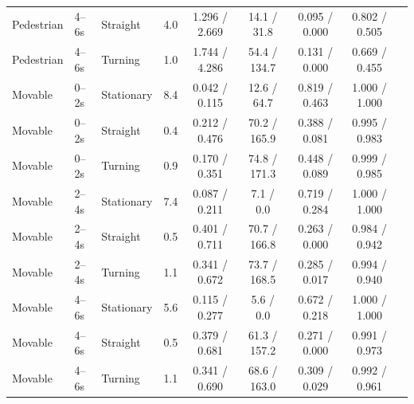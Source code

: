 \begin{tabular}{lllcccccc}
Pedestrian & 4--6s & Straight & 4.0 & 1.296 / 2.669 & 14.1 / 31.8 & 0.095 / 0.000 & 0.802 / 0.505 \\
Pedestrian & 4--6s & Turning & 1.0 & 1.744 / 4.286 & 54.4 / 134.7 & 0.131 / 0.000 & 0.669 / 0.455 \\
\midrule
Movable & 0--2s & Stationary & 8.4 & 0.042 / 0.115 & 12.6 / 64.7 & 0.819 / 0.463 & 1.000 / 1.000 \\
Movable & 0--2s & Straight & 0.4 & 0.212 / 0.476 & 70.2 / 165.9 & 0.388 / 0.081 & 0.995 / 0.983 \\
Movable & 0--2s & Turning & 0.9 & 0.170 / 0.351 & 74.8 / 171.3 & 0.448 / 0.089 & 0.999 / 0.985 \\
Movable & 2--4s & Stationary & 7.4 & 0.087 / 0.211 & 7.1 / 0.0 & 0.719 / 0.284 & 1.000 / 1.000 \\
Movable & 2--4s & Straight & 0.5 & 0.401 / 0.711 & 70.7 / 166.8 & 0.263 / 0.000 & 0.984 / 0.942 \\
Movable & 2--4s & Turning & 1.1 & 0.341 / 0.672 & 73.7 / 168.5 & 0.285 / 0.017 & 0.994 / 0.940 \\
Movable & 4--6s & Stationary & 5.6 & 0.115 / 0.277 & 5.6 / 0.0 & 0.672 / 0.218 & 1.000 / 1.000 \\
Movable & 4--6s & Straight & 0.5 & 0.379 / 0.681 & 61.3 / 157.2 & 0.271 / 0.000 & 0.991 / 0.973 \\
Movable & 4--6s & Turning & 1.1 & 0.341 / 0.690 & 68.6 / 163.0 & 0.309 / 0.029 & 0.992 / 0.961 \\
\bottomrule
\end{tabular}
